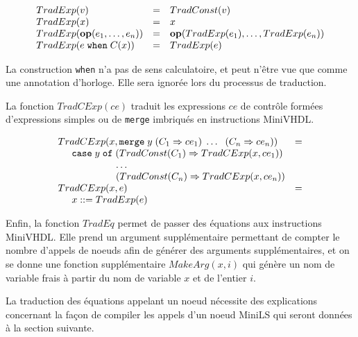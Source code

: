 \documentclass[a4paper]{article}
\newcommand{\mybox}[1]{\mbox{\tt{#1}}}
\newcommand{\ind}[0]{\hspace{0.5cm}}
\newcommand{\coloneqq}[0]{::=}
\newcommand{\Op}[2]{\mybox{\bf{op}}(#1,\dots,#2)}
\newcommand{\When}[3]{#1 \; \mybox{when} \; #2(#3)}
\newcommand{\Merge}[5]{\mybox{merge} \; #1 \; (#2 \Rightarrow #3) \; \dots \; \
  (#4 \Rightarrow #5)}
\newcommand{\Affect}[2]{#1 \coloneqq #2}
\begin{document}
\newcommand{\TradE}[1]{TradExp(#1)}

\[
\begin{array}{lcl}
  \TradE{v} & = & \TradC{v} \\
  \TradE{x} & = & x \\
  \TradE{\Op{e_1}{e_n}} & = & \Op{\TradE{e_1}}{\TradE{e_n}} \\
  \TradE{\When{e}{C}{x}} & = & \TradE{e}
\end{array}
\]

La construction \texttt{when} n'a pas de sens calculatoire, et peut n'\^etre vue
que comme une annotation d'horloge. Elle sera ignor\'ee lors du processus de
traduction.

La fonction $TradCExp(ce)$ traduit les expressions $ce$ de contr\^ole form\'ees
d'expressions simples ou de \texttt{merge} imbriqu\'es en instructions MiniVHDL.

\newcommand{\TradCE}[2]{TradCExp(#1, #2)}

\[
\begin{array}{ll}
  \TradCE{x}{\Merge{y}{C_1}{ce_1}{C_n}{ce_n}} & = \\
  \ind \mathtt{case} \; y \; \mathtt{of} \;
  (\TradC{C_1} \Rightarrow \TradCE{x}{ce_1}) \\
  \hspace{2.1cm} \dots \\
  \hspace{2.1cm} (\TradC{C_n} \Rightarrow \TradCE{x}{ce_n}) \\
  \TradCE{x}{e} & = \\
  \ind \Affect{x}{\TradE{e}}
\end{array}
\]

Enfin, la fonction $TradEq$ permet de passer des \'equations aux instructions
MiniVHDL. Elle prend un argument suppl\'ementaire permettant de compter le nombre
d'appels de noeuds afin de g\'en\'erer des arguments suppl\'ementaires, et on se donne
une fonction suppl\'ementaire $MakeArg(x,i)$ qui g\'en\`ere un nom de variable frais \`a
partir du nom de variable $x$ et de l'entier $i$.

La traduction des \'equations appelant un noeud n\'ecessite des explications
concernant la fa\c{c}on de compiler les appels d'un noeud MiniLS qui seront donn\'ees
\`a la section suivante.

\newcommand{\TradEq}[2]{TradEq(#1,#2)}
\newcommand{\MA}[2]{MakeArg(#1,#2)}
\end{document}
